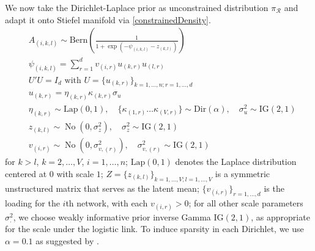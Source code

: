 \documentclass[10pt,fleqn]{article}
\newcommand{\mc}[1]{\mathcal{#1}}
\DeclareMathOperator{\No}{No}
\DeclareMathOperator{\1}{\mathbbm{1}}
\begin{document}
We now
take the Dirichlet-Laplace prior \citep{bhattacharya2015dirichlet} as unconstrained distribution
$\pi_{\mc R}$ and adapt it onto Stiefel manifold via \eqref{constrainedDensity}.
   \begin{equation*}
   \begin{aligned}
   & A_{(i,k,l)} \sim \text{Bern}( \frac{1}{1+ \exp(-\psi_{(i,k,l)}- z_{(k,l)})})\\
   & \psi_{(i,k,l)} = \sum_{r=1}^{d}  v_{(i,r)} u_{(k,r)} u_{(l,r)}  \\
   & U'U=I_{d} \text{ with } U=\{u_{(k,r)}\}_{k=1,\ldots,n; r=1,\ldots,d}\\
           & u_{(k,r)}= \eta_{(k,r)}\kappa_{(k,r)}\sigma_{u} \\
   & \eta_{(k,r)}\sim \text{Lap}(0,1), \quad \{\kappa_{(1,r)}\ldots \kappa_{(V,r)}\} \sim \text{Dir}(\alpha),
    \quad \sigma^2_{u}\sim \text{IG}(2,1)\\   
   & z_{(k,l)} \sim \No(0,\sigma^2_z), \quad  \sigma^2_z \sim \text{IG}(2,1)
   \\
   & v_{(i,r)} \sim \No(0,\sigma^2_{v,(r)}), \quad  \sigma^2_{v,(r)} \sim \text{IG}(2,1)
   \end{aligned}
   \end{equation*}
   for $k>l$, $k=2,\ldots, V$, $i=1,\ldots,n$;  $\text{Lap}(0,1)$ denotes
   the Laplace distribution centered at $0$ with scale $1$; $Z=\{z_{(k,l)}\}_{k=1,\ldots,V;l=1,\ldots,V}$ is a symmetric unstructured matrix that serves as the latent mean; $\{ v_{(i,r)}\}_{r=1,\ldots,d}$
is the loading for the $i$th network, with each $v_{(i,r)}>0$; for all other scale parameters $\sigma^2_.$, we
choose weakly informative prior inverse Gamma $\text{IG}(2,1)$, as appropriate for the scale under the logistic link. To induce sparsity in each Dirichlet,
we use $\alpha=0.1$ as suggested by 
\cite{bhattacharya2015dirichlet}.
\end{document}
